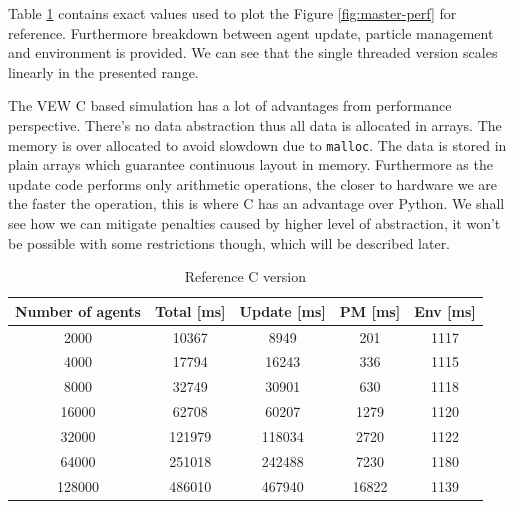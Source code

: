 \documentclass[12pt, a4paper]{report}
\begin{document}
Table \ref{table:reference-timings} contains exact values used to plot the Figure
\ref{fig:master-perf} for reference. Furthermore breakdown between agent update,
particle management and environment is provided. We can see that the single threaded
version scales linearly in the presented range.

The VEW C based simulation has a lot of advantages from performance perspective.
There's no data abstraction thus all data is allocated in arrays. The memory
is over allocated to avoid slowdown due to \lstinline{malloc}. The data is
stored in plain arrays which guarantee continuous layout in memory. Furthermore
as the update code performs only arithmetic operations, the closer to hardware
we are the faster the operation, this is where C has an advantage over Python.
We shall see how we can mitigate penalties caused by higher level of abstraction,
it won't be possible with some restrictions though, which will be described later.

\begin{table}
  \begin{center}
    \begin{tabular}{|c||c||c|c|c|}
    \hline
    Number of agents & Total [ms] & Update [ms] & PM [ms] & Env [ms] \\ \hline
     2000            &  10367                    &  8949             &  201                     &  1117                        \\
    4000             &  17794                    &  16243            &  336                     &  1115                        \\
    8000             &  32749                    &  30901            &  630                     &  1118                        \\
    16000            &  62708                    &  60207            &  1279                    &  1120                        \\
    32000            &  121979                   &  118034           &  2720                    &  1122                        \\
    64000            &  251018                   &  242488           &  7230                    &  1180                        \\
    128000           &  486010                   &  467940           &  16822                   &  1139                        \\ \hline
    \end{tabular}
    \caption {Reference C version}
    \label{table:reference-timings}
  \end{center}
\end{table}
\end{document}
